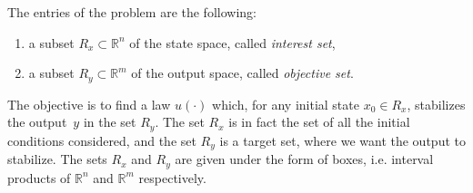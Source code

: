% 

% 



The entries of the problem are the following:
\begin{enumerate}
 \item a subset $R_x \subset \mathbb{R}^n$ of the state space, called {\em interest set},
 \item a subset $R_y \subset \mathbb{R}^m$ of the output space, called {\em objective set}.
\end{enumerate}
The objective is to find a law $u(\cdot)$ which, for any initial state $x_0 \in R_x$, 
stabilizes the output~$y$ in the set $R_y$. 
The set $R_x$ is in fact the set of all the initial 
conditions considered, and the set $R_y$ is a target set, where we want the output to stabilize.
The sets $R_x$ and $R_y$ are given under the form of boxes, i.e. interval products of
$\mathbb{R}^n$ and $\mathbb{R}^m$ respectively.

